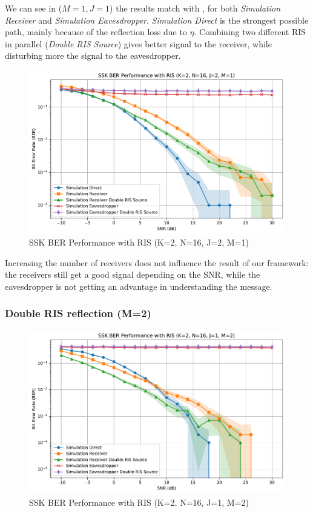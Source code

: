 We can see in ($M=1, J=1$) the results match with \cite{9328149}, for both \textit{Simulation Receiver} and \textit{Simulation Eavesdropper}.
\textit{Simulation Direct} is the strongest possible path, mainly because of the reflection loss due to $\eta$.
Combining two different RIS in parallel (\textit{Double RIS Source}) gives better signal to the receiver, while disturbing more the signal to the eavesdropper.

\begin{figure}[H]
  \centering
  \includegraphics[width=0.8\linewidth]{imgs/ber-simulations/SSK BER Performance with RIS (K=2, N=16, J=2, M=1) ci.pdf}
  \caption{SSK BER Performance with RIS (K=2, N=16, J=2, M=1)}
  \label{fig:simulation_j2_m1}
\end{figure}

Increasing the number of receivers does not influence the result of our framework: the receivers still get a good signal depending on the SNR, while the eavesdropper is not getting an advantage in understanding the message.

\subsubsection{Double RIS reflection (M=2)}

\begin{figure}[H]
  \centering
  \includegraphics[width=0.8\linewidth]{imgs/ber-simulations/SSK BER Performance with RIS (K=2, N=16, J=1, M=2) ci.pdf}
  \caption{SSK BER Performance with RIS (K=2, N=16, J=1, M=2)}
  \label{fig:simulation_j1_m2}
\end{figure}

